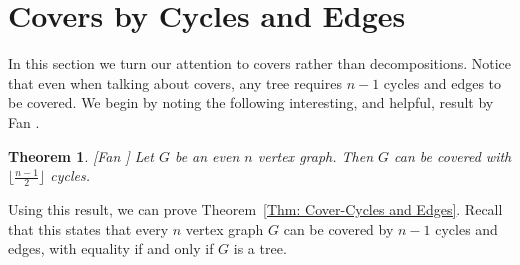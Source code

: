 \documentclass[11pt]{amsart}
\newtheorem{theorem}{Theorem}[section]
\theoremstyle{definition}
\begin{document}
\section{Covers by Cycles and Edges}
\label{Sec: covers}


In this section we turn our attention to covers rather than decompositions.
Notice that even when talking about covers, any tree requires $n-1$ cycles and edges to be covered.
We begin by noting the following interesting, and helpful,
result by Fan \cite{fan2003covers}.

\begin{theorem}\label{fan}[Fan \cite{fan2003covers}]
Let $G$ be an even $n$ vertex graph. Then $G$ can be covered with $\lfloor \frac{n-1}{2}\rfloor$ cycles.
\end{theorem}


Using this result, we can prove Theorem~\ref{Thm: Cover-Cycles and Edges}.
Recall that this states that every $n$ vertex graph $G$ can be covered by $n-1$ cycles and edges,
with equality if and only if $G$ is a tree.
\end{document}
